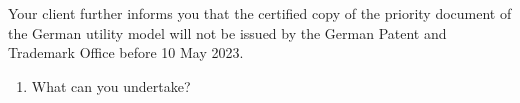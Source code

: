 \documentclass{report}
\begin{document}
\begin{enumerate}[label=\textbf{Answer \arabic*}]
\begin{enumerate}[label=\textbf{Answer \arabic*}]
    \vspace{1em}
    Your client further informs you that the certified copy of the priority document of the German utility model will not be issued by the German Patent and Trademark Office before 10 May 2023.
    \begin{enumerate}[label=(\alph*), resume]
        \item What can you undertake?
    \end{enumerate}

\end{enumerate}
\end{enumerate}
\end{document}
